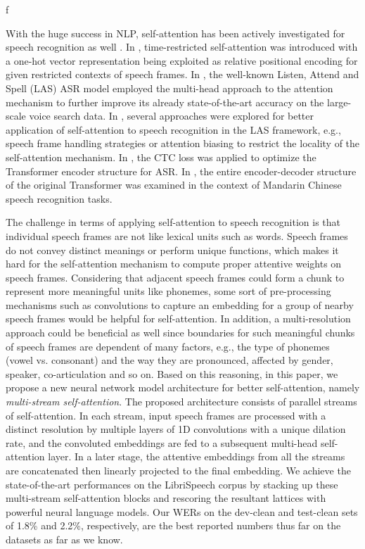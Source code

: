 f\documentclass{article}
\begin{document}
With the huge success in NLP, self-attention has been actively investigated for speech recognition as well \cite{povey18,Chiu18,Sperber18,Salazar19,Dong2018SpeechTransformerAN,zhou18}. In \cite{povey18}, time-restricted self-attention was introduced with a one-hot vector representation being exploited as relative positional encoding for given restricted contexts of speech frames. In \cite{Chiu18}, the well-known Listen, Attend and Spell (LAS) ASR model \cite{chan} employed the multi-head approach to the attention mechanism to further improve its already state-of-the-art accuracy on the large-scale voice search data. In \cite{Sperber18}, several approaches were explored for better application of self-attention to speech recognition in the LAS framework, e.g., speech frame handling strategies or attention biasing to restrict the locality of the self-attention mechanism. In \cite{Salazar19}, the CTC loss \cite{graves06} was applied to optimize the Transformer encoder structure for ASR. In \cite{Dong2018SpeechTransformerAN,zhou18}, the entire encoder-decoder structure of the original Transformer \cite{vaswani} was examined in the context of Mandarin Chinese speech recognition tasks. 

The challenge in terms of applying self-attention to speech recognition is that individual speech frames are not like lexical units such as words. Speech frames do not convey distinct meanings or perform unique functions, which makes it hard for the self-attention mechanism to compute proper attentive weights on speech frames. Considering that adjacent speech frames could form a chunk to represent more meaningful units like phonemes, some sort of pre-processing mechanisms such as convolutions to capture an embedding for a group of nearby speech frames would be helpful for self-attention. In addition, a multi-resolution approach could be beneficial as well since boundaries for such meaningful chunks of speech frames are dependent of many factors, e.g., the type of phonemes (vowel vs. consonant) and the way they are pronounced, affected by gender, speaker, co-articulation and so on. Based on this reasoning, in this paper, we propose a new neural network model architecture for better self-attention, namely \textit{multi-stream self-attention}.  The proposed architecture consists of parallel streams of self-attention. In each stream, input speech frames are processed with a distinct resolution by multiple layers of 1D convolutions with a unique dilation rate, and the convoluted embeddings are fed to a subsequent multi-head self-attention layer. In a later stage, the attentive embeddings from all the streams are concatenated then linearly projected to the final embedding. We achieve the state-of-the-art performances on the LibriSpeech corpus \cite{panayotov2015librispeech} by stacking up these multi-stream self-attention blocks and rescoring the resultant lattices with powerful neural language models. Our WERs on the dev-clean and test-clean sets of 1.8\% and 2.2\%, respectively, are the best reported numbers thus far on the datasets as far as we know. 
\end{document}
